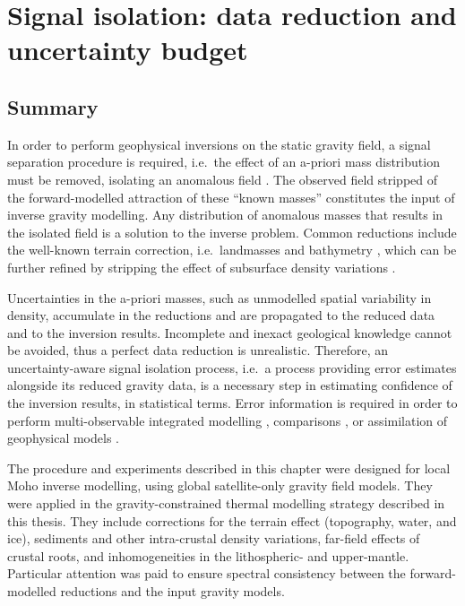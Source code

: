 \chapter{Signal isolation: data reduction and uncertainty budget}
\label{c:SigIs}

\section*{Summary}
\label{ss:SigIs:Summary}
In order to perform geophysical inversions on the static gravity field, a signal separation procedure is required, i.e.~the effect of an a-priori mass distribution must be removed, isolating an anomalous field \parencites[e.g.][]{Tenzer2009}{Tenzer2012}{Sjoberg2013}[][and references therein]{Aitken2015}.
The observed field stripped of the forward-modelled attraction of these ``known masses'' constitutes the input of inverse gravity modelling.
Any distribution of anomalous masses that results in the isolated field is a solution to the inverse problem.
Common reductions include the well-known terrain correction, i.e.~landmasses and bathymetry \parencites{Hinze2003}{Hinze2005}, which can be further refined by stripping the effect of subsurface density variations \parencite{Vajda2008}.

Uncertainties in the a-priori masses, such as unmodelled spatial variability in density, accumulate in the reductions and are propagated to the reduced data and to the inversion results.
Incomplete and inexact geological knowledge cannot be avoided, thus a perfect data reduction is unrealistic.
Therefore, an uncertainty-aware signal isolation process, i.e.~a process providing error estimates alongside its reduced gravity data, is a necessary step in estimating confidence of the inversion results, in statistical terms.
Error information is required in order to perform multi-observable integrated modelling \parencite[e.g.][]{Afonso2013}, comparisons \parencite[e.g.][]{Root2017}, or assimilation of geophysical models \parencites[e.g.~to assemble large scale maps from local studies, see][]{Tesauro2008}{Grad2009}{Molinari2011}.

The procedure and experiments described in this chapter were designed for local Moho inverse modelling, using global satellite-only gravity field models.
They were applied in the gravity-constrained thermal modelling strategy described in this thesis.
They include corrections for the terrain effect (topography, water, and ice), sediments and other intra-crustal density variations, far-field effects of crustal roots, and inhomogeneities in the lithospheric- and upper-mantle.
Particular attention was paid to ensure spectral consistency between the forward-modelled reductions and the input gravity models.

